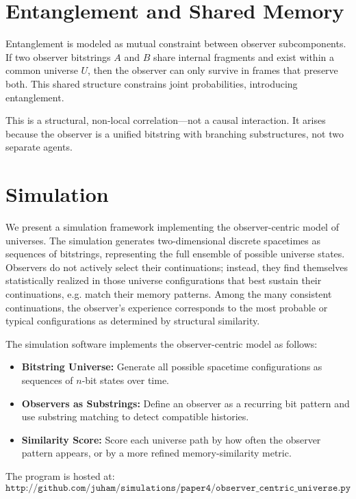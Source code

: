 \documentclass[12pt]{article}
\begin{document}
\section{Entanglement and Shared Memory}

Entanglement is modeled as mutual constraint between observer subcomponents. If two observer bitstrings $A$ and $B$ share internal fragments and exist within a common universe $U$, then the observer can only survive in frames that preserve both. This shared structure constrains joint probabilities, introducing entanglement.

This is a structural, non-local correlation—not a causal interaction. It arises because the observer is a unified bitstring with branching substructures, not two separate agents.

\section{Simulation}

We present a simulation framework implementing the observer-centric model of universes. The simulation generates two-dimensional discrete spacetimes as sequences of bitstrings, representing the full ensemble of possible universe states. Observers do not actively select their continuations; instead, they find themselves statistically realized in those universe configurations that best sustain their continuations, e.g. match their memory patterns. Among the many consistent continuations, the observer's experience corresponds to the most probable or typical configurations as determined by structural similarity.

The simulation software implements the observer-centric model as follows:

\begin{itemize}
    \item \textbf{Bitstring Universe:} Generate all possible spacetime configurations as sequences of $n$-bit states over time.
    \item \textbf{Observers as Substrings:} Define an observer as a recurring bit pattern and use substring matching to detect compatible histories.
    \item \textbf{Similarity Score:} Score each universe path by how often the observer pattern appears, or by a more refined memory-similarity metric.
\end{itemize}

The program is hosted at:
\[
    \texttt{http://github.com/juham/simulations/paper4/observer\_centric\_universe.py}
\]
\end{document}

